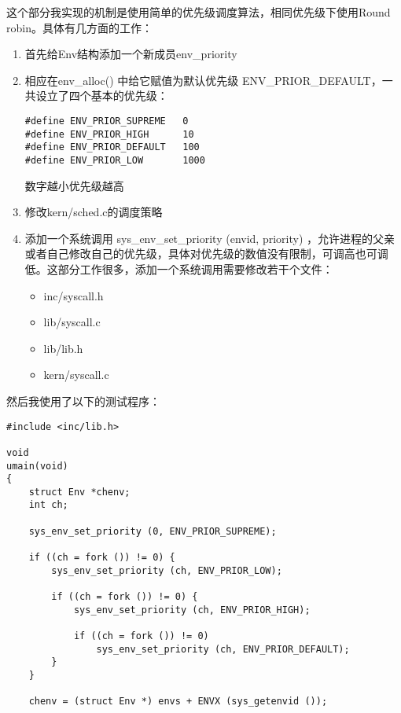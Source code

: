 \documentclass{article}
\newcommand{\funcname}[1]{{\ttfamily \small #1}}
\begin{document}
\begin{CJK*}{UTF8}{gkai}
这个部分我实现的机制是使用简单的优先级调度算法，相同优先级下使用Round robin。具体有几方面的工作：

\begin{enumerate}
\item{首先给Env结构添加一个新成员env\_priority}
\item{相应在\funcname{env\_alloc()} 中给它赋值为默认优先级 ENV\_PRIOR\_DEFAULT，一共设立了四个基本的优先级：

\begin{lstlisting}[style=ccode, title={\scriptsize \ttfamily \bfseries inc/env.h}]
#define ENV_PRIOR_SUPREME   0
#define ENV_PRIOR_HIGH      10
#define ENV_PRIOR_DEFAULT   100
#define ENV_PRIOR_LOW       1000
\end{lstlisting}
数字越小优先级越高

}
\item{修改kern/sched.c的调度策略}
\item{添加一个系统调用 \funcname{sys\_env\_set\_priority (envid, priority)} ，允许进程的父亲或者自己修改自己的优先级，具体对优先级的数值没有限制，可调高也可调低。这部分工作很多，添加一个系统调用需要修改若干个文件：

\begin{itemize}
\item{inc/syscall.h}
\item{lib/syscall.c}
\item{lib/lib.h}
\item{kern/syscall.c}
\end{itemize}
}
\end{enumerate}

然后我使用了以下的测试程序：

\begin{lstlisting}[style=ccode, title={\scriptsize \ttfamily \bfseries user/priorsched.c}]
#include <inc/lib.h>

void
umain(void)
{
    struct Env *chenv;
    int ch;

    sys_env_set_priority (0, ENV_PRIOR_SUPREME);
    
    if ((ch = fork ()) != 0) {
        sys_env_set_priority (ch, ENV_PRIOR_LOW);

        if ((ch = fork ()) != 0) {
            sys_env_set_priority (ch, ENV_PRIOR_HIGH);

            if ((ch = fork ()) != 0) 
                sys_env_set_priority (ch, ENV_PRIOR_DEFAULT);
        }
    }

    chenv = (struct Env *) envs + ENVX (sys_getenvid ());


\end{lstlisting}
\end{CJK*}
\end{document}
